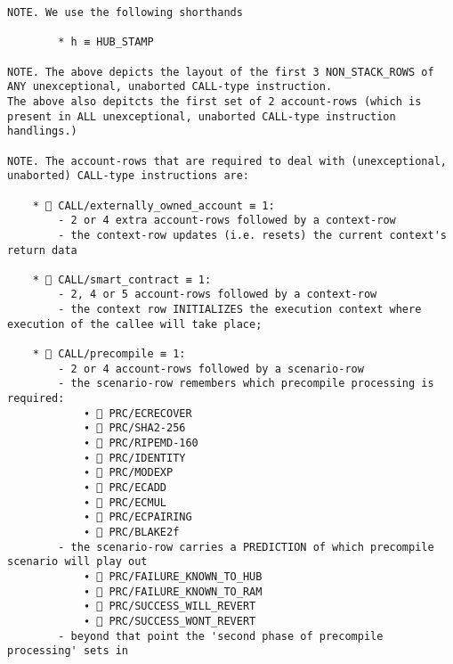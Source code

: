 \documentclass[varwidth=\maxdimen,margin=0.5cm,multi={verbatim}]{standalone}
\begin{document}
\begin{verbatim}
NOTE. We use the following shorthands

        * h ≡ HUB_STAMP

NOTE. The above depicts the layout of the first 3 NON_STACK_ROWS of ANY unexceptional, unaborted CALL-type instruction.
The above also depitcts the first set of 2 account-rows (which is present in ALL unexceptional, unaborted CALL-type instruction handlings.)

NOTE. The account-rows that are required to deal with (unexceptional, unaborted) CALL-type instructions are:

    *  CALL/externally_owned_account ≡ 1:
        - 2 or 4 extra account-rows followed by a context-row
        - the context-row updates (i.e. resets) the current context's return data

    *  CALL/smart_contract ≡ 1:
        - 2, 4 or 5 account-rows followed by a context-row
        - the context row INITIALIZES the execution context where execution of the callee will take place;

    *  CALL/precompile ≡ 1:
        - 2 or 4 account-rows followed by a scenario-row
        - the scenario-row remembers which precompile processing is required:
            ∙  PRC/ECRECOVER
            ∙  PRC/SHA2-256
            ∙  PRC/RIPEMD-160
            ∙  PRC/IDENTITY
            ∙  PRC/MODEXP
            ∙  PRC/ECADD
            ∙  PRC/ECMUL
            ∙  PRC/ECPAIRING
            ∙  PRC/BLAKE2f
        - the scenario-row carries a PREDICTION of which precompile scenario will play out
            ∙  PRC/FAILURE_KNOWN_TO_HUB
            ∙  PRC/FAILURE_KNOWN_TO_RAM
            ∙  PRC/SUCCESS_WILL_REVERT
            ∙  PRC/SUCCESS_WONT_REVERT
        - beyond that point the 'second phase of precompile processing' sets in

\end{verbatim}
\end{document}
